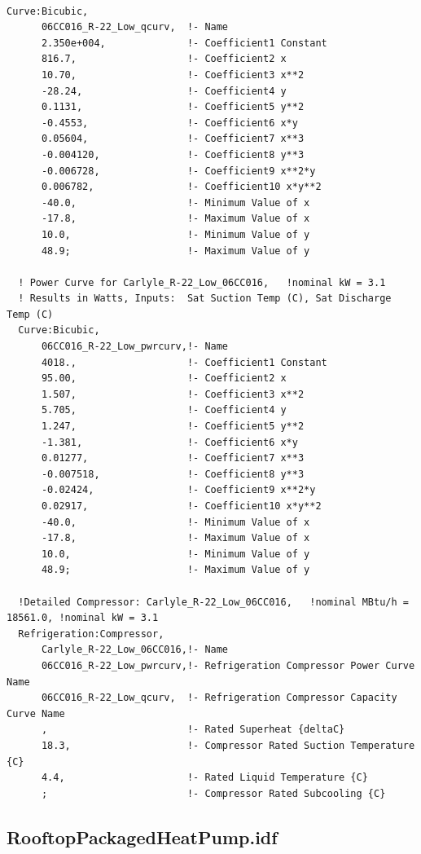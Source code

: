 \begin{lstlisting}

Curve:Bicubic,
      06CC016_R-22_Low_qcurv,  !- Name
      2.350e+004,              !- Coefficient1 Constant
      816.7,                   !- Coefficient2 x
      10.70,                   !- Coefficient3 x**2
      -28.24,                  !- Coefficient4 y
      0.1131,                  !- Coefficient5 y**2
      -0.4553,                 !- Coefficient6 x*y
      0.05604,                 !- Coefficient7 x**3
      -0.004120,               !- Coefficient8 y**3
      -0.006728,               !- Coefficient9 x**2*y
      0.006782,                !- Coefficient10 x*y**2
      -40.0,                   !- Minimum Value of x
      -17.8,                   !- Maximum Value of x
      10.0,                    !- Minimum Value of y
      48.9;                    !- Maximum Value of y

  ! Power Curve for Carlyle_R-22_Low_06CC016,   !nominal kW = 3.1
  ! Results in Watts, Inputs:  Sat Suction Temp (C), Sat Discharge Temp (C)
  Curve:Bicubic,
      06CC016_R-22_Low_pwrcurv,!- Name
      4018.,                   !- Coefficient1 Constant
      95.00,                   !- Coefficient2 x
      1.507,                   !- Coefficient3 x**2
      5.705,                   !- Coefficient4 y
      1.247,                   !- Coefficient5 y**2
      -1.381,                  !- Coefficient6 x*y
      0.01277,                 !- Coefficient7 x**3
      -0.007518,               !- Coefficient8 y**3
      -0.02424,                !- Coefficient9 x**2*y
      0.02917,                 !- Coefficient10 x*y**2
      -40.0,                   !- Minimum Value of x
      -17.8,                   !- Maximum Value of x
      10.0,                    !- Minimum Value of y
      48.9;                    !- Maximum Value of y

  !Detailed Compressor: Carlyle_R-22_Low_06CC016,   !nominal MBtu/h = 18561.0, !nominal kW = 3.1
  Refrigeration:Compressor,
      Carlyle_R-22_Low_06CC016,!- Name
      06CC016_R-22_Low_pwrcurv,!- Refrigeration Compressor Power Curve Name
      06CC016_R-22_Low_qcurv,  !- Refrigeration Compressor Capacity Curve Name
      ,                        !- Rated Superheat {deltaC}
      18.3,                    !- Compressor Rated Suction Temperature {C}
      4.4,                     !- Rated Liquid Temperature {C}
      ;                        !- Compressor Rated Subcooling {C}
\end{lstlisting}

\subsection{RooftopPackagedHeatPump.idf}\label{rooftoppackagedheatpump.idf}

